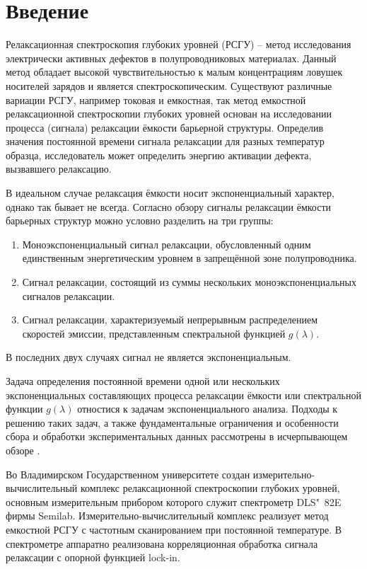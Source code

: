 \section{Введение}
Релаксационная спектроскопия глубоких уровней (РСГУ) -- метод исследования 
электрически активных дефектов в полупроводниковых материалах. Данный метод 
обладает высокой чувствительностью к малым концентрациям ловушек носителей 
зарядов и является спектроскопическим. Существуют различные вариации РСГУ, 
например токовая и емкостная, так метод емкостной релаксационной спектроскопии 
глубоких уровней основан на исследовании процесса (сигнала) релаксации ёмкости 
барьерной структуры. Определив значения постоянной времени сигнала релаксации 
для разных температур образца, исследователь может определить энергию активации 
дефекта, вызвавшего релаксацию. 

В идеальном случае релаксация ёмкости носит экспоненциальный характер, однако 
так бывает не всегда. Согласно обзору \cite{istratov_exp_analysis} 
сигналы релаксации ёмкости барьерных структур можно условно разделить на три 
группы:
    \begin{enumerate}
        \item Моноэкспоненциальный сигнал релаксации, обусловленный одним 
        единственным энергетическим уровнем в запрещённой зоне полупроводника.
        \item Сигнал релаксации, состоящий из суммы нескольких 
        моноэкспоненциальных сигналов релаксации.
        \item Сигнал релаксации, характеризуемый непрерывным распределением 
        скоростей эмиссии, представленным спектральной функцией $g(\lambda)$.
    \end{enumerate}
В последних двух случаях сигнал не является экспоненциальным. 

Задача определения постоянной времени одной или нескольких экспоненциальных 
составляющих процесса релаксации ёмкости или спектральной функции $g(\lambda)$ 
отностися к задачам экспоненциального анализа. Подходы к решению таких задач,
а также фундаментальные ограничения и особенности сбора и обработки 
экспериментальных данных рассмотрены в исчерпывающем обзоре 
\cite{istratov_exp_analysis}.

Во Владимирском Государственном университете создан измерительно-вычислительный
комплекс релаксационной спектроскопии глубоких уровней, основным измерительным
прибором которого служит спектрометр DLS"~82E фирмы Semilab. 
Измерительно-вычислительный комплекс реализует метод емкостной РСГУ с частотным
сканированием при постоянной температуре. В спектрометре аппаратно реализована
корреляционная обработка сигнала релаксации с опорной функцией lock-in. 


